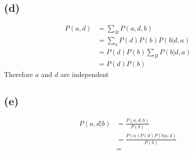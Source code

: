 \documentclass[12pt]{article}
\begin{document}
\subsection*{(d)}
\begin{align*}
   P(a,d)&= \sum_{B}P(a,d,b)\\
   &=\sum_{a}P(d)P(b)P(b|d,a)\\
   &=P(d)P(b)\sum_{B}P(b|d,a)\\
   &=P(d)P(b)
\end{align*}
Therefore $a$ and $d$ are independent
\subsection*{(e)}
\begin{align*}
    P(a,d|b)&= \frac{P(a,d,b)}{P(b)}\\
    &=\frac{P(a)P(d)P(b|a,d)}{P(b)}\\
    &=
 \end{align*}
\end{document}
